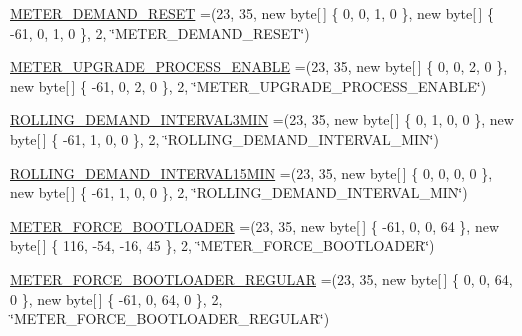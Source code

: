 \begin{DoxyCompactItemize}
\item 
\hyperlink{enumcom_1_1eneri_1_1scorpio__metertool_1_1hardwarelayer_1_1_flags_passwords_a244fba009513f3ace697bee452a067bc}{M\+E\+T\+E\+R\+\_\+\+D\+E\+M\+A\+N\+D\+\_\+\+R\+E\+S\+ET} =(23, 35, new byte\mbox{[}$\,$\mbox{]} \{ 0, 0, 1, 0 \}, new byte\mbox{[}$\,$\mbox{]} \{ -\/61, 0, 1, 0 \}, 2, \char`\"{}M\+E\+T\+E\+R\+\_\+\+D\+E\+M\+A\+N\+D\+\_\+\+R\+E\+S\+ET\char`\"{})
\item 
\hyperlink{enumcom_1_1eneri_1_1scorpio__metertool_1_1hardwarelayer_1_1_flags_passwords_a1cc3a79c3022141285f4f6450d2f6389}{M\+E\+T\+E\+R\+\_\+\+U\+P\+G\+R\+A\+D\+E\+\_\+\+P\+R\+O\+C\+E\+S\+S\+\_\+\+E\+N\+A\+B\+LE} =(23, 35, new byte\mbox{[}$\,$\mbox{]} \{ 0, 0, 2, 0 \}, new byte\mbox{[}$\,$\mbox{]} \{ -\/61, 0, 2, 0 \}, 2, \char`\"{}M\+E\+T\+E\+R\+\_\+\+U\+P\+G\+R\+A\+D\+E\+\_\+\+P\+R\+O\+C\+E\+S\+S\+\_\+\+E\+N\+A\+B\+LE\char`\"{})
\item 
\hyperlink{enumcom_1_1eneri_1_1scorpio__metertool_1_1hardwarelayer_1_1_flags_passwords_a13e9eac949da84cd5d6abcd5d677cbc5}{R\+O\+L\+L\+I\+N\+G\+\_\+\+D\+E\+M\+A\+N\+D\+\_\+\+I\+N\+T\+E\+R\+V\+A\+L3\+M\+IN} =(23, 35, new byte\mbox{[}$\,$\mbox{]} \{ 0, 1, 0, 0 \}, new byte\mbox{[}$\,$\mbox{]} \{ -\/61, 1, 0, 0 \}, 2, \char`\"{}R\+O\+L\+L\+I\+N\+G\+\_\+\+D\+E\+M\+A\+N\+D\+\_\+\+I\+N\+T\+E\+R\+V\+A\+L\+\_\+M\+IN\char`\"{})
\item 
\hyperlink{enumcom_1_1eneri_1_1scorpio__metertool_1_1hardwarelayer_1_1_flags_passwords_a240e56955fa9bdbe1e4a2af8b20583c2}{R\+O\+L\+L\+I\+N\+G\+\_\+\+D\+E\+M\+A\+N\+D\+\_\+\+I\+N\+T\+E\+R\+V\+A\+L15\+M\+IN} =(23, 35, new byte\mbox{[}$\,$\mbox{]} \{ 0, 0, 0, 0 \}, new byte\mbox{[}$\,$\mbox{]} \{ -\/61, 1, 0, 0 \}, 2, \char`\"{}R\+O\+L\+L\+I\+N\+G\+\_\+\+D\+E\+M\+A\+N\+D\+\_\+\+I\+N\+T\+E\+R\+V\+A\+L\+\_\+M\+IN\char`\"{})
\item 
\hyperlink{enumcom_1_1eneri_1_1scorpio__metertool_1_1hardwarelayer_1_1_flags_passwords_a6ff15381e50b2a304f3c58460d2ab513}{M\+E\+T\+E\+R\+\_\+\+F\+O\+R\+C\+E\+\_\+\+B\+O\+O\+T\+L\+O\+A\+D\+ER} =(23, 35, new byte\mbox{[}$\,$\mbox{]} \{ -\/61, 0, 0, 64 \}, new byte\mbox{[}$\,$\mbox{]} \{ 116, -\/54, -\/16, 45 \}, 2, \char`\"{}M\+E\+T\+E\+R\+\_\+\+F\+O\+R\+C\+E\+\_\+\+B\+O\+O\+T\+L\+O\+A\+D\+ER\char`\"{})
\item 
\hyperlink{enumcom_1_1eneri_1_1scorpio__metertool_1_1hardwarelayer_1_1_flags_passwords_a58ae406e1302e3db7db2c6dd1200ddf3}{M\+E\+T\+E\+R\+\_\+\+F\+O\+R\+C\+E\+\_\+\+B\+O\+O\+T\+L\+O\+A\+D\+E\+R\+\_\+\+R\+E\+G\+U\+L\+AR} =(23, 35, new byte\mbox{[}$\,$\mbox{]} \{ 0, 0, 64, 0 \}, new byte\mbox{[}$\,$\mbox{]} \{ -\/61, 0, 64, 0 \}, 2, \char`\"{}M\+E\+T\+E\+R\+\_\+\+F\+O\+R\+C\+E\+\_\+\+B\+O\+O\+T\+L\+O\+A\+D\+E\+R\+\_\+\+R\+E\+G\+U\+L\+AR\char`\"{})

\end{DoxyCompactItemize}
